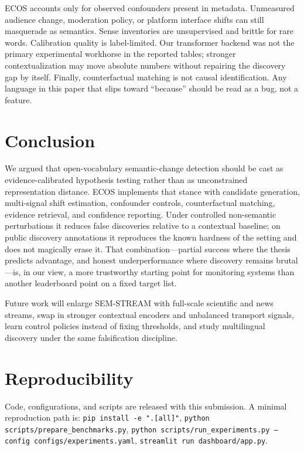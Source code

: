 \documentclass[journal]{IEEEtran}
\begin{document}
ECOS accounts only for observed confounders present in metadata.
Unmeasured audience change, moderation policy, or platform interface shifts can still masquerade as semantics.
Sense inventories are unsupervised and brittle for rare words.
Calibration quality is label-limited.
Our transformer backend was not the primary experimental workhorse in the reported tables; stronger contextualization may move absolute numbers without repairing the discovery gap by itself.
Finally, counterfactual matching is not causal identification.
Any language in this paper that slips toward ``because'' should be read as a bug, not a feature.

\section{Conclusion}
\label{sec:conclusion}

We argued that open-vocabulary semantic-change detection should be cast as evidence-calibrated hypothesis testing rather than as unconstrained representation distance.
ECOS implements that stance with candidate generation, multi-signal shift estimation, confounder controls, counterfactual matching, evidence retrieval, and confidence reporting.
Under controlled non-semantic perturbations it reduces false discoveries relative to a contextual baseline; on public discovery annotations it reproduces the known hardness of the setting and does not magically erase it.
That combination---partial success where the thesis predicts advantage, and honest underperformance where discovery remains brutal---is, in our view, a more trustworthy starting point for monitoring systems than another leaderboard point on a fixed target list.

Future work will enlarge SEM-STREAM with full-scale scientific and news streams, swap in stronger contextual encoders and unbalanced transport signals, learn control policies instead of fixing thresholds, and study multilingual discovery under the same falsification discipline.

\section*{Reproducibility}
Code, configurations, and scripts are released with this submission.
A minimal reproduction path is:
\texttt{pip install -e ".[all]"},
\texttt{python scripts/prepare\_benchmarks.py},
\texttt{python scripts/run\_experiments.py --config configs/experiments.yaml},
\texttt{streamlit run dashboard/app.py}.
\end{document}
